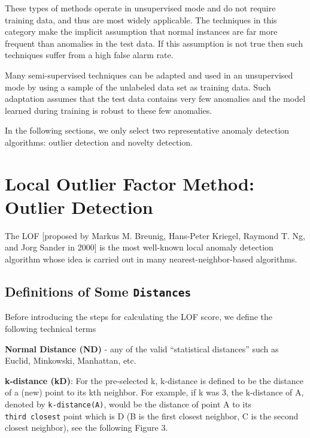\documentclass[
]{book}
\begin{document}
These types of methods operate in unsupervised mode and do not require training data, and thus are most widely applicable. The techniques in this category make the implicit assumption that normal instances are far more frequent than anomalies in the test data. If this assumption is not true then such techniques suffer from a high false alarm rate.

Many semi-supervised techniques can be adapted and used in an unsupervised
mode by using a sample of the unlabeled data set as training data. Such adaptation
assumes that the test data contains very few anomalies and the model learned during
training is robust to these few anomalies.

In the following sections, we only select two representative anomaly detection algorithms: outlier detection and novelty detection.

\hypertarget{local-outlier-factor-method-outlier-detection}{%
\section{Local Outlier Factor Method: Outlier Detection}\label{local-outlier-factor-method-outlier-detection}}

The LOF {[}proposed by Markus M. Breunig, Hans-Peter Kriegel, Raymond T. Ng, and Jorg Sander in 2000{]} is the most well-known local anomaly detection algorithm whose idea is carried out in many nearest-neighbor-based algorithms.

\hypertarget{definitions-of-some-distances}{%
\subsection{\texorpdfstring{Definitions of Some \texttt{Distances}}{Definitions of Some Distances}}\label{definitions-of-some-distances}}

Before introducing the steps for calculating the LOF score, we define the following technical terms

\textbf{Normal Distance (ND)} - any of the valid ``statistical distances'' such as Euclid, Minkowski, Manhattan, etc.

\textbf{k-distance (kD)}: For the pre-selected k, k-distance is defined to be the distance of a (new) point to its kth neighbor. For example, if k was 3, the k-distance of A, denoted by \texttt{k-distance(A)}, would be the distance of point A to its \texttt{third\ closest} point which is D (B is the first closest neighbor, C is the second closest neighbor), see the following Figure 3.
\end{document}
